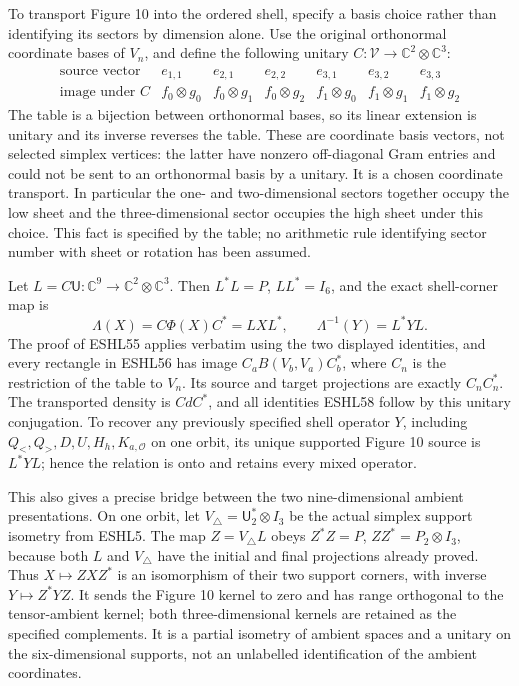 \documentclass[
  10pt,
  a4paper,
]{article}
\begin{document}
To transport Figure 10 into the ordered shell, specify a basis choice
rather than identifying its sectors by dimension alone. Use the original
orthonormal coordinate bases of \(V_n\), and define the following
unitary \(C:\mathcal V\to\mathbb C^2\otimes\mathbb C^3\): \[
\begin{array}{c|cccccc}
\text{source vector}&e_{1,1}&e_{2,1}&e_{2,2}&e_{3,1}&e_{3,2}&e_{3,3}\\\hline
\text{image under }C&f_0\otimes g_0&f_0\otimes g_1&f_0\otimes g_2&f_1\otimes g_0&f_1\otimes g_1&f_1\otimes g_2
\end{array}
\tag{ESHL60}
\] The table is a bijection between orthonormal bases, so its linear
extension is unitary and its inverse reverses the table. These are
coordinate basis vectors, not selected simplex vertices: the latter have
nonzero off-diagonal Gram entries and could not be sent to an
orthonormal basis by a unitary. It is a chosen coordinate transport. In
particular the one- and two-dimensional sectors together occupy the low
sheet and the three-dimensional sector occupies the high sheet under
this choice. This fact is specified by the table; no arithmetic rule
identifying sector number with sheet or rotation has been assumed.

Let \(L=C\mathsf U:\mathbb C^9\to\mathbb C^2\otimes\mathbb C^3\). Then
\(L^*L=P\), \(LL^*=I_6\), and the exact shell-corner map is \[
\Lambda(X)=C\Phi(X)C^*=LXL^*,\qquad
\Lambda^{-1}(Y)=L^*YL.
\tag{ESHL61}
\] The proof of ESHL55 applies verbatim using the two displayed
identities, and every rectangle in ESHL56 has image
\(C_aB(V_b,V_a)C_b^*\), where \(C_n\) is the restriction of the table to
\(V_n\). Its source and target projections are exactly \(C_nC_n^*\). The
transported density is \(CdC^*\), and all identities ESHL58 follow by
this unitary conjugation. To recover any previously specified shell
operator \(Y\), including \(Q_<,Q_>,D,U,H_h,K_{a,\mathcal O}\) on one
orbit, its unique supported Figure 10 source is \(L^*YL\); hence the
relation is onto and retains every mixed operator.

This also gives a precise bridge between the two nine-dimensional
ambient presentations. On one orbit, let
\(V_\triangle=\mathsf U_2^*\otimes I_3\) be the actual simplex support
isometry from ESHL5. The map \(Z=V_\triangle L\) obeys \(Z^*Z=P\),
\(ZZ^*=P_2\otimes I_3\), because both \(L\) and \(V_\triangle\) have the
initial and final projections already proved. Thus \(X\mapsto ZXZ^*\) is
an isomorphism of their two support corners, with inverse
\(Y\mapsto Z^*YZ\). It sends the Figure 10 kernel to zero and has range
orthogonal to the tensor-ambient kernel; both three-dimensional kernels
are retained as the specified complements. It is a partial isometry of
ambient spaces and a unitary on the six-dimensional supports, not an
unlabelled identification of the ambient coordinates.
\end{document}
